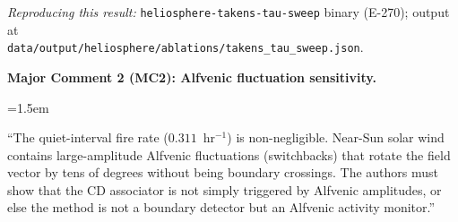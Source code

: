 \documentclass{article}
\newenvironment{reviewcomment}[1]{%
  \vspace{0.5em}
  \noindent\textbf{#1}\par\vspace{0.2em}
  \begin{list}{}{\leftmargin=1.5em}\item\itshape
}{%
  \end{list}\vspace{0.5em}
}
\begin{document}
\smallskip\noindent\textit{Reproducing this result:}
\texttt{heliosphere-takens-tau-sweep} binary (E-270); output at\\
\texttt{data/output/heliosphere/ablations/takens\_tau\_sweep.json}.

\begin{reviewcomment}{Major Comment 2 (MC2): Alfvenic fluctuation sensitivity.}
``The quiet-interval fire rate ($0.311$~hr$^{-1}$) is non-negligible.
Near-Sun solar wind contains large-amplitude Alfvenic fluctuations
(switchbacks) that rotate the field vector by tens of degrees without
being boundary crossings.  The authors must show that the CD associator
is not simply triggered by Alfvenic amplitudes, or else the method is
not a boundary detector but an Alfvenic activity monitor.''
\end{reviewcomment}
\end{document}
